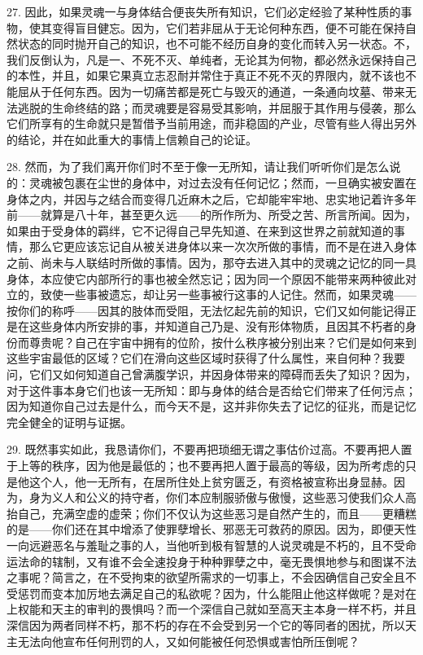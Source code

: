 27. 因此，如果灵魂一与身体结合便丧失所有知识，它们必定经验了某种性质的事物，使其变得盲目健忘。因为，它们若非屈从于无论何种东西，便不可能在保持自然状态的同时抛开自己的知识，也不可能不经历自身的变化而转入另一状态。不，我们反倒认为，凡是一、不死不灭、单纯者，无论其为何物，都必然永远保持自己的本性，并且，如果它果真立志忍耐并常住于真正不死不灭的界限内，就不该也不能屈从于任何东西。因为一切痛苦都是死亡与毁灭的通道，一条通向坟墓、带来无法逃脱的生命终结的路；而灵魂要是容易受其影响，并屈服于其作用与侵袭，那么它们所享有的生命就只是暂借予当前用途，而非稳固的产业，尽管有些人得出另外的结论，并在如此重大的事情上信赖自己的论证。\par

28. 然而，为了我们离开你们时不至于像一无所知，请让我们听听你们是怎么说的：灵魂被包裹在尘世的身体中，对过去没有任何记忆；然而，一旦确实被安置在身体之内，并因与之结合而变得几近麻木之后，它却能牢牢地、忠实地记着许多年前——就算是八十年，甚至更久远——的所作所为、所受之苦、所言所闻。因为，如果由于受身体的羁绊，它不记得自己早先知道、在来到这世界之前就知道的事情，那么它更应该忘记自从被关进身体以来一次次所做的事情，而不是在进入身体之前、尚未与人联结时所做的事情。因为，那夺去进入其中的灵魂之记忆的同一具身体，本应使它内部所行的事也被全然忘记；因为同一个原因不能带来两种彼此对立的，致使一些事被遗忘，却让另一些事被行这事的人记住。然而，如果灵魂——按你们的称呼——因其的肢体而受阻，无法忆起先前的知识，它们又如何能记得正是在这些身体内所安排的事，并知道自己乃是、没有形体物质，且因其不朽者的身份而尊贵呢？自己在宇宙中拥有的位阶，按什么秩序被分别出来？它们是如何来到这些宇宙最低的区域？它们在滑向这些区域时获得了什么属性，来自何种？我要问，它们又如何知道自己曾满腹学识，并因身体带来的障碍而丢失了知识？因为，对于这件事本身它们也该一无所知：即与身体的结合是否给它们带来了任何污点；因为知道你自己过去是什么，而今天不是，这并非你失去了记忆的征兆，而是记忆完全健全的证明与证据。\par

29. 既然事实如此，我恳请你们，不要再把琐细无谓之事估价过高。不要再把人置于上等的秩序，因为他是最低的；也不要再把人置于最高的等级，因为所考虑的只是他这个人，他一无所有，在居所住处上贫穷匮乏，有资格被宣称出身显赫。因为，身为义人和公义的持守者，你们本应制服骄傲与傲慢，这些恶习使我们众人高抬自己，充满空虚的虚荣；你们不仅认为这些恶习是自然产生的，而且——更糟糕的是——你们还在其中增添了使罪孽增长、邪恶无可救药的原因。因为，即便天性一向远避恶名与羞耻之事的人，当他听到极有智慧的人说灵魂是不朽的，且不受命运法命的辖制，又有谁不会全速投身于种种罪孽之中，毫无畏惧地参与和图谋不法之事呢？简言之，在不受拘束的欲望所需求的一切事上，不会因确信自己安全且不受惩罚而变本加厉地去满足自己的私欲呢？因为，什么能阻止他这样做呢？是对在上权能和天主的审判的畏惧吗？而一个深信自己就如至高天主本身一样不朽，并且深信因为两者同样不朽，那不朽的存在不会受到另一个它的等同者的困扰，所以天主无法向他宣布任何刑罚的人，又如何能被任何恐惧或害怕所压倒呢？\par

